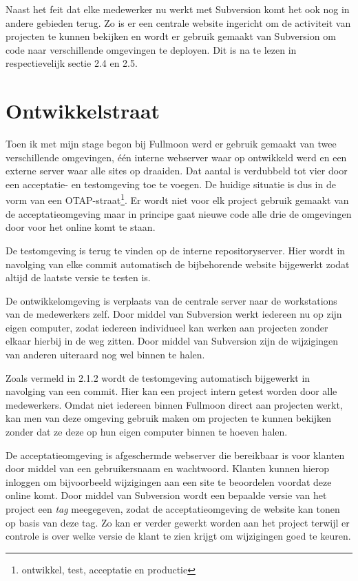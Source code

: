 Naast het feit dat elke medewerker nu werkt met Subversion komt het ook nog in andere gebieden terug. Zo is er een centrale website ingericht om de activiteit van projecten te kunnen bekijken en wordt er gebruik gemaakt van Subversion om code naar verschillende omgevingen te deployen. Dit is na te lezen in respectievelijk sectie 2.4 en 2.5.

\section{Ontwikkelstraat}

Toen ik met mijn stage begon bij Fullmoon werd er gebruik gemaakt van twee verschillende omgevingen, één interne webserver waar op ontwikkeld werd en een externe server waar alle sites op draaiden. Dat aantal is verdubbeld tot vier door een acceptatie- en testomgeving toe te voegen. De huidige situatie is dus in de vorm van een OTAP-straat\footnote{ontwikkel, test, acceptatie en productie}. Er wordt niet voor elk project gebruik gemaakt van de acceptatieomgeving maar in principe gaat nieuwe code alle drie de omgevingen door voor het online komt te staan.

De testomgeving is terug te vinden op de interne repositoryserver. Hier wordt in navolging van elke commit automatisch de bijbehorende website bijgewerkt zodat altijd de laatste versie te testen is.

De ontwikkelomgeving is verplaats van de centrale server naar de workstations van de medewerkers zelf. Door middel van Subversion werkt iedereen nu op zijn eigen computer, zodat iedereen individueel kan werken aan projecten zonder elkaar hierbij in de weg zitten. Door middel van Subversion zijn de wijzigingen van anderen uiteraard nog wel binnen te halen.

Zoals vermeld in 2.1.2 wordt de testomgeving automatisch bijgewerkt in navolging van een commit. Hier kan een project intern getest worden door alle medewerkers. Omdat niet iedereen binnen Fullmoon direct aan projecten werkt, kan men van deze omgeving gebruik maken om projecten te kunnen bekijken zonder dat ze deze op hun eigen computer binnen te hoeven halen.

De acceptatieomgeving is afgeschermde webserver die bereikbaar is voor klanten door middel van een gebruikersnaam en wachtwoord. Klanten kunnen hierop inloggen om bijvoorbeeld wijzigingen aan een site te beoordelen voordat deze online komt. Door middel van Subversion wordt een bepaalde versie van het project een \emph{tag} meegegeven, zodat de acceptatieomgeving de website kan tonen op basis van deze tag. Zo kan er verder gewerkt worden aan het project terwijl er controle is over welke versie de klant te zien krijgt om wijzigingen goed te keuren.

